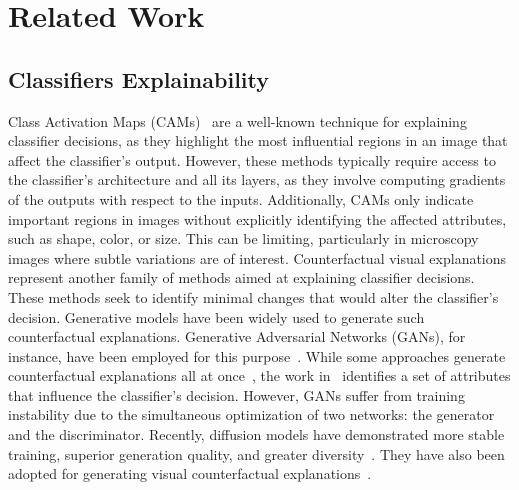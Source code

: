 \section{Related Work}
\subsection{Classifiers Explainability}
Class Activation Maps (CAMs)~\cite{grad_cam1,grad_cam2} are a well-known technique for explaining classifier decisions, as they highlight the most influential regions in an image that affect the classifier's output. However, these methods typically require access to the classifier's architecture and all its layers, as they involve computing gradients of the outputs with respect to the inputs. Additionally, CAMs only indicate important regions in images without explicitly identifying the affected attributes, such as shape, color, or size. This can be limiting, particularly in microscopy images where subtle variations are of interest. Counterfactual visual explanations represent another family of methods aimed at explaining classifier decisions. These methods seek to identify minimal changes that would alter the classifier's decision. Generative models have been widely used to generate such counterfactual explanations. Generative Adversarial Networks (GANs), for instance, have been employed for this purpose~\cite{Singla2020,Lang_2021_ICCV,Goetschalckx_2019_ICCV_ganalyze}. While some approaches generate counterfactual explanations all at once~\cite{Singla2020,Goetschalckx_2019_ICCV_ganalyze}, the work in~\cite{Lang_2021_ICCV} identifies a set of attributes that influence the classifier's decision. However, GANs suffer from training instability due to the simultaneous optimization of two networks: the generator and the discriminator. Recently, diffusion models have demonstrated more stable training, superior generation quality, and greater diversity~\cite{diffusion_beat_gans,improved_denoising_diffusion_models}. They have also been adopted for generating visual counterfactual explanations~\cite{dvce,time_WACV,global_counterfactual_explanations}.


